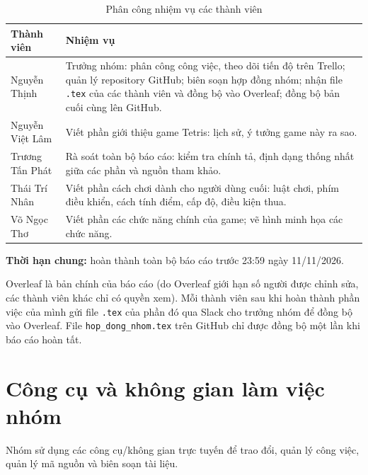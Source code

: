 \documentclass[12pt,a4paper,oneside]{report}
\begin{document}
\begin{table}[H]
\centering
\vspace{-0.8cm}
\caption{Phân công nhiệm vụ các thành viên}\label{tab:phan_cong_nhiem_vu}
\renewcommand{\arraystretch}{1.45}
\begin{tabular}{|>{\raggedright}p{3.4cm}|>{\raggedright\arraybackslash}p{9.2cm}|}
\hline
\textbf{Thành viên} & \textbf{Nhiệm vụ} \\ \hline
Nguyễn Thịnh &
Trưởng nhóm: phân công công việc, theo dõi tiến độ trên Trello; quản lý repository GitHub; biên soạn hợp đồng nhóm; nhận file \texttt{.tex} của các thành viên và đồng bộ vào Overleaf; đồng bộ bản cuối cùng lên GitHub.
\\ \hline
Nguyễn Việt Lâm &
Viết phần giới thiệu game Tetris: lịch sử, ý tưởng game này ra sao.
\\ \hline
Trương Tấn Phát &
Rà soát toàn bộ báo cáo: kiểm tra chính tả, định dạng thống nhất giữa các phần và nguồn tham khảo.
\\ \hline
Thái Trí Nhân &
Viết phần cách chơi dành cho người dùng cuối: luật chơi, phím điều khiển, cách tính điểm, cấp độ, điều kiện thua.
\\ \hline
Võ Ngọc Thơ &
Viết phần các chức năng chính của game; vẽ hình minh họa các chức năng.
\\ \hline
\end{tabular}
\end{table}

\textbf{Thời hạn chung:} hoàn thành toàn bộ báo cáo trước 23:59 ngày 11/11/2026.

Overleaf là bản chính của báo cáo (do Overleaf giới hạn số người được chỉnh sửa, các thành viên khác chỉ có quyền xem). Mỗi thành viên sau khi hoàn thành phần việc của mình gửi file \texttt{.tex} của phần đó qua Slack cho trưởng nhóm để đồng bộ vào Overleaf. File \texttt{hop\_dong\_nhom.tex} trên GitHub chỉ được đồng bộ một lần khi báo cáo hoàn tất.

\section{Công cụ và không gian làm việc nhóm}

Nhóm sử dụng các công cụ/không gian trực tuyến để trao đổi, quản lý công việc, quản lý mã nguồn và biên soạn tài liệu.
\end{document}
